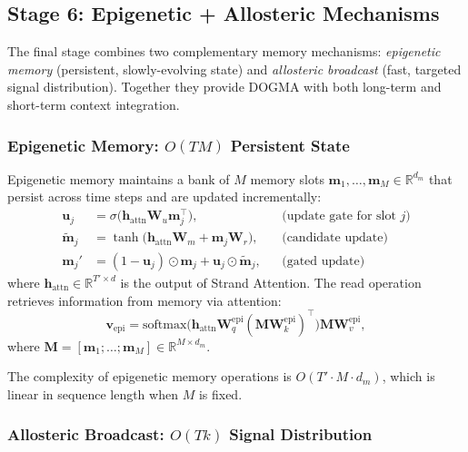 \subsection{Stage 6: Epigenetic + Allosteric Mechanisms}
\label{sec:stage-epigenetic}

The final stage combines two complementary memory mechanisms: \emph{epigenetic memory} (persistent, slowly-evolving state) and \emph{allosteric broadcast} (fast, targeted signal distribution). Together they provide DOGMA with both long-term and short-term context integration.

\subsubsection{Epigenetic Memory: $O(TM)$ Persistent State}

Epigenetic memory maintains a bank of $M$ memory slots $\mathbf{m}_1, \ldots, \mathbf{m}_M \in \mathbb{R}^{d_m}$ that persist across time steps and are updated incrementally:
\begin{align}
\mathbf{u}_j &= \sigma\bigl(\mathbf{h}_{\text{attn}} \mathbf{W}_u \mathbf{m}_j^\top\bigr), && \text{(update gate for slot } j\text{)} \label{eq:epi-update-gate} \\
\tilde{\mathbf{m}}_j &= \tanh\bigl(\mathbf{h}_{\text{attn}} \mathbf{W}_m + \mathbf{m}_j \mathbf{W}_r\bigr), && \text{(candidate update)} \label{eq:epi-candidate} \\
\mathbf{m}_j' &= (1 - \mathbf{u}_j) \odot \mathbf{m}_j + \mathbf{u}_j \odot \tilde{\mathbf{m}}_j, && \text{(gated update)} \label{eq:epi-gated}
\end{align}
where $\mathbf{h}_{\text{attn}} \in \mathbb{R}^{T' \times d}$ is the output of Strand Attention. The read operation retrieves information from memory via attention:
\begin{equation}
\mathbf{v}_{\text{epi}} = \mathrm{softmax}\bigl(\mathbf{h}_{\text{attn}} \mathbf{W}_q^{\text{epi}} (\mathbf{M} \mathbf{W}_k^{\text{epi}})^\top\bigr) \mathbf{M} \mathbf{W}_v^{\text{epi}},
\label{eq:epi-read}
\end{equation}
where $\mathbf{M} = [\mathbf{m}_1; \ldots; \mathbf{m}_M] \in \mathbb{R}^{M \times d_m}$.

The complexity of epigenetic memory operations is $O(T' \cdot M \cdot d_m)$, which is linear in sequence length when $M$ is fixed.

\subsubsection{Allosteric Broadcast: $O(Tk)$ Signal Distribution}

